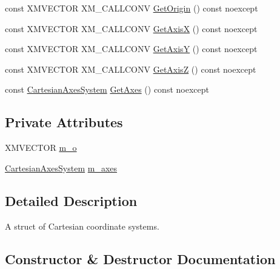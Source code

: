 \begin{DoxyCompactItemize}
\item 
const X\+M\+V\+E\+C\+T\+OR X\+M\+\_\+\+C\+A\+L\+L\+C\+O\+NV \hyperlink{structmage_1_1_cartesian_coordinate_system_a5fa9322a605e7190c491fbf54a07f657}{Get\+Origin} () const noexcept
\item 
const X\+M\+V\+E\+C\+T\+OR X\+M\+\_\+\+C\+A\+L\+L\+C\+O\+NV \hyperlink{structmage_1_1_cartesian_coordinate_system_a59f51cb1f4d0822c307038ed18e66b2a}{Get\+AxisX} () const noexcept
\item 
const X\+M\+V\+E\+C\+T\+OR X\+M\+\_\+\+C\+A\+L\+L\+C\+O\+NV \hyperlink{structmage_1_1_cartesian_coordinate_system_a1d95be712ec657d1a39aca97d31c9195}{Get\+AxisY} () const noexcept
\item 
const X\+M\+V\+E\+C\+T\+OR X\+M\+\_\+\+C\+A\+L\+L\+C\+O\+NV \hyperlink{structmage_1_1_cartesian_coordinate_system_aa70df85f23edacf47520fb7a67c1d34f}{Get\+AxisZ} () const noexcept
\item 
const \hyperlink{structmage_1_1_cartesian_axes_system}{Cartesian\+Axes\+System} \hyperlink{structmage_1_1_cartesian_coordinate_system_ae329f2a0d4d3a4c96d745d3af10fcaad}{Get\+Axes} () const noexcept
\end{DoxyCompactItemize}
\subsection*{Private Attributes}
\begin{DoxyCompactItemize}
\item 
X\+M\+V\+E\+C\+T\+OR \hyperlink{structmage_1_1_cartesian_coordinate_system_a1ea373bb91be991ee221a2ce1e02be2b}{m\+\_\+o}
\item 
\hyperlink{structmage_1_1_cartesian_axes_system}{Cartesian\+Axes\+System} \hyperlink{structmage_1_1_cartesian_coordinate_system_acf7b8cf35026f5fa8fc11a126b96b055}{m\+\_\+axes}
\end{DoxyCompactItemize}


\subsection{Detailed Description}
A struct of Cartesian coordinate systems. 

\subsection{Constructor \& Destructor Documentation}
\hypertarget{structmage_1_1_cartesian_coordinate_system_a1cc660de888515c85f427a57f488dd5a}{}\label{structmage_1_1_cartesian_coordinate_system_a1cc660de888515c85f427a57f488dd5a} 
